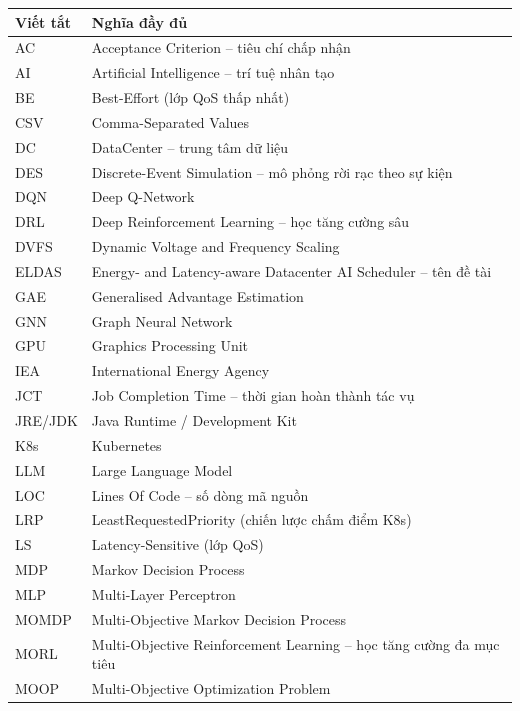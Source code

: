 \begin{appendices}
\begin{table}[H]
  \centering
  \footnotesize
  \begin{tabularx}{\linewidth}{l X}
    \toprule
    \textbf{Viết tắt} & \textbf{Nghĩa đầy đủ} \\
    \midrule
    AC      & Acceptance Criterion -- tiêu chí chấp nhận \\
    AI      & Artificial Intelligence -- trí tuệ nhân tạo \\
    BE      & Best-Effort (lớp QoS thấp nhất) \\
    CSV     & Comma-Separated Values \\
    DC      & DataCenter -- trung tâm dữ liệu \\
    DES     & Discrete-Event Simulation -- mô phỏng rời rạc theo sự kiện \\
    DQN     & Deep Q-Network \\
    DRL     & Deep Reinforcement Learning -- học tăng cường sâu \\
    DVFS    & Dynamic Voltage and Frequency Scaling \\
    ELDAS   & Energy- and Latency-aware Datacenter AI Scheduler -- tên đề tài \\
    GAE     & Generalised Advantage Estimation \\
    GNN     & Graph Neural Network \\
    GPU     & Graphics Processing Unit \\
    IEA     & International Energy Agency \\
    JCT     & Job Completion Time -- thời gian hoàn thành tác vụ \\
    JRE/JDK & Java Runtime / Development Kit \\
    K8s     & Kubernetes \\
    LLM     & Large Language Model \\
    LOC     & Lines Of Code -- số dòng mã nguồn \\
    LRP     & LeastRequestedPriority (chiến lược chấm điểm K8s) \\
    LS      & Latency-Sensitive (lớp QoS) \\
    MDP     & Markov Decision Process \\
    MLP     & Multi-Layer Perceptron \\
    MOMDP   & Multi-Objective Markov Decision Process \\
    MORL    & Multi-Objective Reinforcement Learning -- học tăng cường đa mục tiêu \\
    MOOP    & Multi-Objective Optimization Problem \\

\end{tabularx}
\end{table}
\end{appendices}
